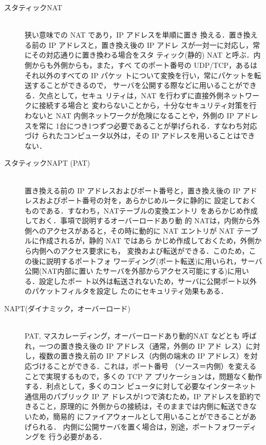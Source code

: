 \begin{description}
 \item[スタティックNAT] \ \\
            狭い意味での NAT であり，IP アドレスを単順に置き
	    換える．置き換える前の IP アドレスと，置き換え後の IP アドレ
	    スが一対一に対応し，常にその対応通りに置き換わる場合をスタ
	    ティック(静的) NAT と呼ぶ．内側からも外側からも，また，すべ
	    てのポート番号の UDP/TCP，あるはそれ以外のすべての IP パケッ
	    トについて変換を行い，常にパケットを転送することができるので，
	    サーバを公開する際などに用いることができる．欠点として，セキュ
	    リティは，NAT を行わずに直接外側ネットワークに接続する場合と
	    変わらないことから，十分なセキュリティ対策を行わないと NAT 
	    内側ネットワークが危険になることや，外側の IP アドレスを常に
	    1台につき1つずつ必要であることが挙げられる．すなわち対応づけ
	    られたコンピュータ以外は，その IP アドレスを用いることはでき
	    ない．
 \item[スタティックNAPT (PAT)] \ \\
            置き換える前の IP アドレスおよびポート番号と，置き換え後の 
	    IP アドレスおよびポート番号の対を，あらかじめルータに静的に
	    設定しておくものである．すなわち，NATテーブルの変換エントリ
	    をあらかじめ作成しておく．事項で説明するオーバーロードあり動
	    的 NATは，内側から外側へのアクセスがあると，その時に動的に
            NAT エントリが NAT テーブルに作成されるが，静的 NAT ではあら
            かじめ作成しておくため，外側から内側へのアクセス要求にも，
            変換および転送ができる．このため，この後に説明するポートフォ
            ワーディング(ポート転送)に用いられ，サーバ公開(NAT内部に置い
            たサーバを外部からアクセス可能にする)に用いる．設定したポー
            ト以外は転送されないため，サーバに公開ポート以外のパケットフィルタを設定し
            たのにセキュリティ効果もある．
 \item[NAPT(ダイナミック，オーバーロード)] \ \\
            PAT, マスカレーディング，オーバーロードあり動的NAT などとも
	    呼ばれ，一つの置き換え後の IP アドレス（通常，外側の IP アド
	    レス）に対し，複数の置き換え前の IP アドレス（内側の端末の
	    IP アドレス）を対応づけることができる．これは，ポート番号
	    （ソース＝内側）を変えることで実現するもので，多くの TCP ア
	    プリケーションは，問題なく動作する．利点として，多くのコン
	    ピュータに対して必要なインターネット通信用のパブリック IP ア
	    ドレスが1つで済むため，IP アドレスを節約できること，原理的に
	    外側からの接続は，そのままでは内側に転送できないため，簡易的
	    にファイアウォールとして用いることができることがあげられる．
	    内側に公開サーバを置く場合は，別途，ポートフォワーディングを
	    行う必要がある．
\end{description}


